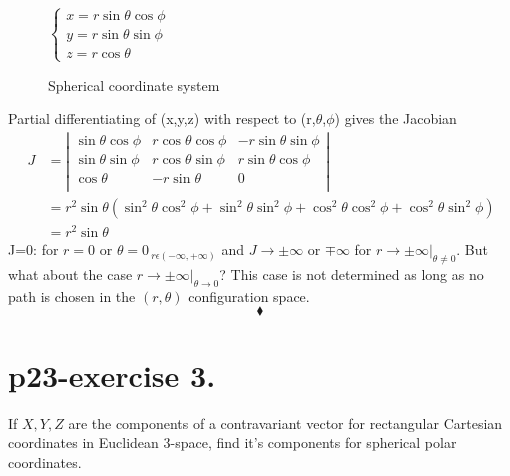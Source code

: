 \begin{figure}[h]
\centering
\begin{minipage}[t]{.6\textwidth}
\vspace{0pt}

\end{minipage}\hfill
\begin{minipage}[t]{0.3\textwidth}
\vspace{50pt}
$\left\{ \begin{array}{c}
    x= r\sin \theta \cos \phi \\
     y= r\sin \theta\sin \phi \\
      z= r\cos\theta 
  \end{array} \right.$
\end{minipage}
\caption{Spherical coordinate system}
\end{figure}
Partial differentiating of (x,y,z) with respect to (r,$\theta$,$\phi$) gives the Jacobian
\begin{align}
\ J&=
\left| {\begin{array}{ccc}
    \sin \theta \cos \phi & r\cos \theta\cos \phi  & -r\sin \theta \sin \phi\\
    \sin \theta \sin \phi & r\cos \theta\sin \phi  & r\sin\theta \cos\phi\\
    \cos\theta  & -r\sin \theta &0\\
  \end{array} } \right|
  \\
\ &= r^2\sin \theta (\sin^2 \theta\cos^2 \phi + \sin^2 \theta \sin^2 \phi + \cos^2\theta \cos^2\phi + \cos^2\theta\sin^2\phi)\\
\  &= r^2\sin \theta 
\end{align}
J=0: for $r=0$ or $\theta = 0_{\ r \epsilon (-\infty, +\infty)}$ and $J\rightarrow \pm\infty$ or $\mp\infty$ for $r\rightarrow \pm\infty|_{\theta\neq 0}$. But what about the case $r\rightarrow \pm\infty|_{\theta\rightarrow 0}$? This case is not determined as long as no path is chosen in the $(r,\theta)$ configuration space.
$$\blacklozenge$$
\pagebreak[4]

\section{p23-exercise 3.}
\begin{tcolorbox}
If $X, Y,Z$ are the components of a contravariant vector for rectangular Cartesian coordinates in Euclidean 3-space, find it's components for spherical polar coordinates.
\end{tcolorbox}

